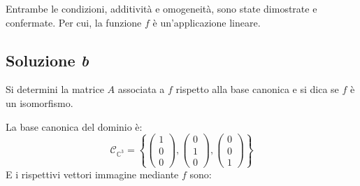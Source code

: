 \documentclass[a4paper]{article}
\begin{document}
	\noindent
	Entrambe le condizioni, additività e omogeneità, sono state dimostrate e confermate. Per cui, la funzione $f$ è un'applicazione lineare.\newpage
	
	\subsection{Soluzione \emph{b}}
	
	Si determini la matrice $A$ associata a $f$ rispetto alla base canonica e si dica se $f$ è un isomorfismo.\newline
	
	\noindent
	La base canonica del dominio è:
	\begin{equation*}
		\mathcal{C}_{\mathbb{C}^{3}} = \left\{
		\begin{pmatrix}
			1 \\ 0 \\ 0
		\end{pmatrix}, 
		\begin{pmatrix}
			0 \\ 1 \\ 0
		\end{pmatrix}, 
		\begin{pmatrix}
			0 \\ 0 \\ 1
		\end{pmatrix}
		\right\}
	\end{equation*}
	E i rispettivi vettori immagine mediante $f$ sono:
\end{document}
